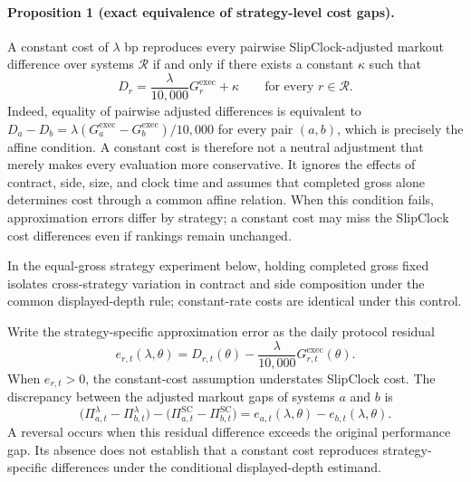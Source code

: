 \documentclass[sigconf]{acmart}
\begin{document}
\paragraph{Proposition 1 (exact equivalence of strategy-level cost gaps).}
A constant cost of $\lambda$ bp reproduces every pairwise SlipClock-adjusted markout difference over systems $\mathcal R$ if and only if there exists a constant $\kappa$ such that
\begin{equation}
D_r=\frac{\lambda}{10{,}000}G^{\mathrm{exec}}_r+\kappa
\qquad\text{for every }r\in\mathcal R.
\end{equation}
Indeed, equality of pairwise adjusted differences is equivalent to $D_a-D_b=\lambda(G^{\mathrm{exec}}_a-G^{\mathrm{exec}}_b)/10{,}000$ for every pair $(a,b)$, which is precisely the affine condition. A constant cost is therefore not a neutral adjustment that merely makes every evaluation more conservative. It ignores the effects of contract, side, size, and clock time and assumes that completed gross alone determines cost through a common affine relation. When this condition fails, approximation errors differ by strategy; a constant cost may miss the SlipClock cost differences even if rankings remain unchanged.

In the equal-gross strategy experiment below, holding completed gross fixed isolates cross-strategy variation in contract and side composition under the common displayed-depth rule; constant-rate costs are identical under this control.

Write the strategy-specific approximation error as the daily protocol residual
\begin{equation}
e_{r,t}(\lambda,\theta)=D_{r,t}(\theta)
-\frac{\lambda}{10{,}000}G^{\mathrm{exec}}_{r,t}(\theta).
\label{eq:protocol-residual}
\end{equation}
When $e_{r,t}>0$, the constant-cost assumption understates SlipClock cost. The discrepancy between the adjusted markout gaps of systems $a$ and $b$ is
\begin{equation}
\big(\Pi^{\lambda}_{a,t}-\Pi^{\lambda}_{b,t}\big)
-\big(\Pi^{\mathrm{SC}}_{a,t}-\Pi^{\mathrm{SC}}_{b,t}\big)
=e_{a,t}(\lambda,\theta)-e_{b,t}(\lambda,\theta).
\label{eq:pairwise-distortion}
\end{equation}
A reversal occurs when this residual difference exceeds the original performance gap. Its absence does not establish that a constant cost reproduces strategy-specific differences under the conditional displayed-depth estimand.
\end{document}
